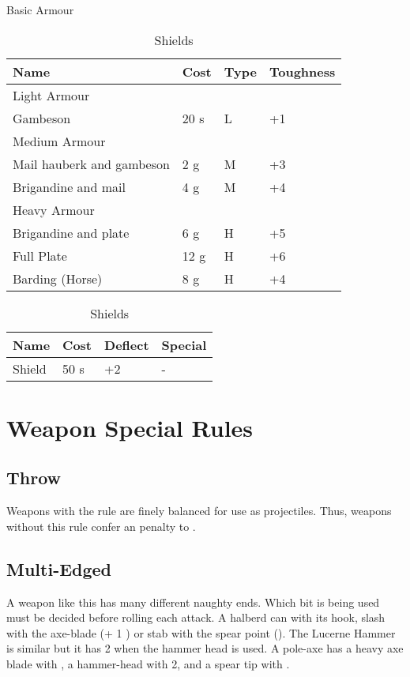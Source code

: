 \begin{table}[ht]
	\centering
	\caption{Basic Armour}
	\begin{tabular}{|l|l|l|l|}
		\hline
		Name  & Cost & Type & Toughness\\
		\hline
		Light Armour & & &  \\
		\hline
		Gambeson & 20 s & L & +1  \\
		\hline
		Medium Armour & & &  \\
		\hline
		Mail hauberk and gambeson & 2 g & M & +3   \\ 
		Brigandine and mail  & 4 g & M & +4  \\
		\hline
		Heavy Armour & & &  \\
		\hline
		Brigandine and plate & 6 g & H & +5 \\
		Full Plate  & 12 g & H & +6  \\
		\hline
		Barding (Horse)& 8 g & H & +4 \\
		\hline
	\end{tabular}
	\caption{Shields}
	\begin{tabular}{|l|l|l|l|}
		\hline
		Name & Cost & Deflect & Special\\   
		\hline
		Shield & 50 s & +2 & - \\
		\hline
	\end{tabular}
\end{table}





\section{Weapon Special Rules}

\subsection{Throw}
Weapons with the  rule are finely balanced for use as projectiles. Thus, weapons without this rule confer an  penalty to .

\subsection{Multi-Edged}
A weapon like this has many different naughty ends. Which bit is being used must be decided before rolling each attack. A halberd can  with its hook, slash with the axe-blade (+ 1 ) or stab with the spear point (). The Lucerne Hammer is similar but it has  2 when the hammer head is used. A pole-axe has a heavy axe blade with , a hammer-head with  2, and a spear tip with .

